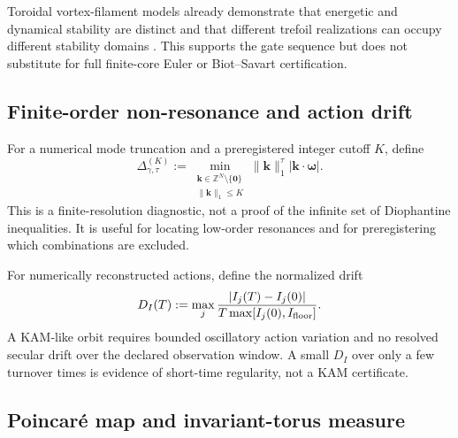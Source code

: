 Toroidal vortex-filament models already demonstrate that energetic and
dynamical stability are distinct and that different trefoil realizations can
occupy different stability domains \cite{KolokolnikovTicknorKevrekidis2020}.
This supports the gate sequence but does not substitute for full finite-core
Euler or Biot--Savart certification.

\subsection{Finite-order non-resonance and action drift}
\label{subsec:rt_kam_nonresonance_drift}

For a numerical mode truncation and a preregistered integer cutoff \(K\), define
\begin{equation}
    \Delta_{\gamma,\tau}^{(K)}
    :=
    \min_{\substack{
    \mathbf k\in\mathbb Z^N\setminus\{\mathbf0\}\\
    \lVert\mathbf k\rVert_1\leq K
    }}
    \lVert\mathbf k\rVert_1^{\tau}
    \left|
    \mathbf k\cdot\boldsymbol\omega
    \right|.
    \label{eq:rt_kam_finite_diophantine_margin}
\end{equation}
This is a finite-resolution diagnostic, not a proof of the infinite set of
Diophantine inequalities.  It is useful for locating low-order resonances and
for preregistering which combinations are excluded.

For numerically reconstructed actions, define the normalized drift
\begin{equation}
    D_I(T)
    :=
    \max_j
    \frac{
    |I_j(T)-I_j(0)|
    }{
    T\max[I_j(0),I_{\rm floor}]
    }.
    \label{eq:rt_kam_action_drift}
\end{equation}
A KAM-like orbit requires bounded oscillatory action variation and no resolved
secular drift over the declared observation window.  A small
\(D_I\) over only a few turnover times is evidence of short-time regularity,
not a KAM certificate.

\subsection{Poincar\'e map and invariant-torus measure}
\label{subsec:rt_kam_poincare_map}


